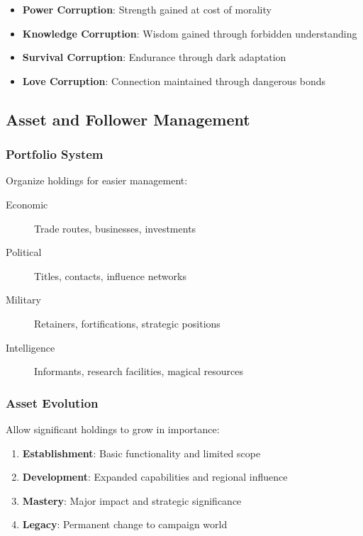 \documentclass[11pt]{article}
\begin{document}
\begin{itemize}
  \item \textbf{Power Corruption}: Strength gained at cost of morality
  \item \textbf{Knowledge Corruption}: Wisdom gained through forbidden understanding
  \item \textbf{Survival Corruption}: Endurance through dark adaptation
  \item \textbf{Love Corruption}: Connection maintained through dangerous bonds
\end{itemize}

\subsection{Asset and Follower Management}

\subsubsection{Portfolio System}

Organize holdings for easier management:

\begin{description}
  \item[Economic] Trade routes, businesses, investments
  \item[Political] Titles, contacts, influence networks
  \item[Military] Retainers, fortifications, strategic positions
  \item[Intelligence] Informants, research facilities, magical resources
\end{description}

\subsubsection{Asset Evolution}

Allow significant holdings to grow in importance:

\begin{enumerate}
  \item \textbf{Establishment}: Basic functionality and limited scope
  \item \textbf{Development}: Expanded capabilities and regional influence
  \item \textbf{Mastery}: Major impact and strategic significance
  \item \textbf{Legacy}: Permanent change to campaign world
\end{enumerate}
\end{document}
